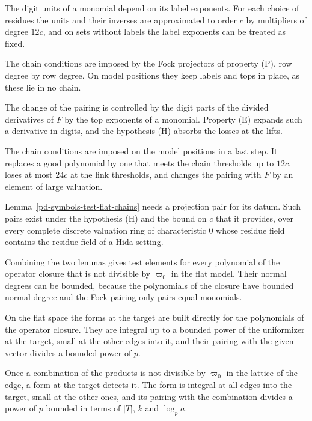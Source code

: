 The digit units of a monomial depend on its label exponents. For each choice of residues the units and their inverses
are approximated to order $c$ by multipliers of degree $12c$, and on sets without labels the label exponents can be
treated as fixed.

The chain conditions are imposed by the Fock projectors of property (P), row degree by row degree. On model positions
they keep labels and tops in place, as these lie in no chain.

The change of the pairing is controlled by the digit parts of the divided derivatives of $F$ by the top exponents of a
monomial. Property (E) expands such a derivative in digits, and the hypothesis (H) absorbs the losses at the lifts.

The chain conditions are imposed on the model positions in a last step. It replaces a good polynomial by one that
meets the chain thresholds up to $12c$, loses at most $24c$ at the link thresholds, and changes the pairing with $F$ by
an element of large valuation.

Lemma~\ref{pd-symbols-test-flat-chains} needs a projection pair for its datum. Such pairs exist under the hypothesis
(H) and the bound on $c$ that it provides, over every complete discrete valuation ring of characteristic
$0$ whose residue field contains the residue field of a Hida setting.

Combining the two lemmas gives test elements for every polynomial of the operator closure that is not
divisible by $\varpi_0$ in the flat model. Their normal degrees can be bounded, because the polynomials of
the closure have bounded normal degree and the Fock pairing only pairs equal monomials.

On the flat space the forms at the target are built directly for the polynomials of the operator
closure. They are integral up to a bounded power of the uniformizer at the target, small at the other
edges into it, and their pairing with the given vector divides a bounded power of $p$.

Once a combination of the products is not divisible by $\varpi_0$ in the lattice of the edge, a form at
the target detects it. The form is integral at all edges into the target, small at the other ones,
and its pairing with the combination divides a power of $p$ bounded in terms of $|T|$, $k$ and
$\log_pa$.

